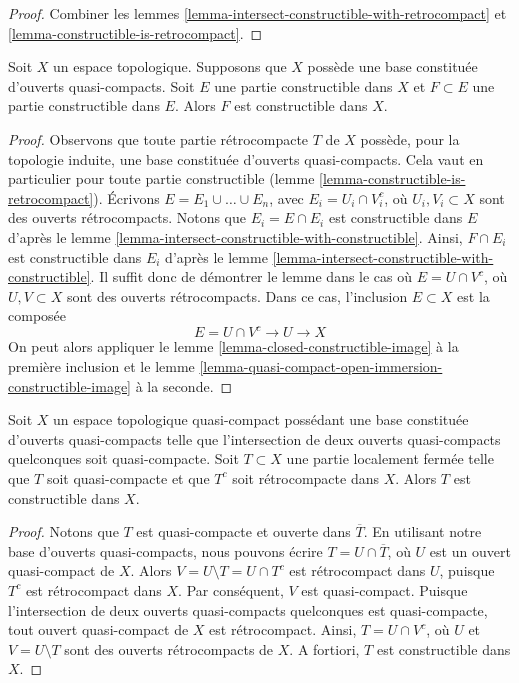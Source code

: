\begin{proof}
Combiner les lemmes \ref{lemma-intersect-constructible-with-retrocompact} et
\ref{lemma-constructible-is-retrocompact}.
\end{proof}

\begin{lemma}
\label{lemma-constructible-in-constructible}
Soit $X$ un espace topologique. Supposons que
$X$ possède une base constituée d'ouverts quasi-compacts.
Soit $E$ une partie constructible dans $X$ et $F \subset E$ une partie constructible dans $E$.
Alors $F$ est constructible dans $X$.
\end{lemma}

\begin{proof}
Observons que toute partie rétrocompacte $T$ de $X$ possède, pour la topologie
induite, une base constituée d'ouverts quasi-compacts. Cela vaut en particulier
pour toute partie constructible
(lemme \ref{lemma-constructible-is-retrocompact}).
Écrivons $E = E_1 \cup \ldots \cup E_n$, avec $E_i = U_i \cap V_i^c$,
où $U_i, V_i \subset X$ sont des ouverts rétrocompacts.
Notons que $E_i = E \cap E_i$ est constructible dans $E$ d'après le
lemme \ref{lemma-intersect-constructible-with-constructible}.
Ainsi, $F \cap E_i$ est constructible dans $E_i$ d'après le
lemme \ref{lemma-intersect-constructible-with-constructible}.
Il suffit donc de démontrer le lemme dans le cas où $E = U \cap V^c$,
où $U, V \subset X$ sont des ouverts rétrocompacts.
Dans ce cas, l'inclusion $E \subset X$ est la composée
$$
E = U \cap V^c \to U \to X
$$
On peut alors appliquer le lemme \ref{lemma-closed-constructible-image}
à la première inclusion et le
lemme \ref{lemma-quasi-compact-open-immersion-constructible-image}
à la seconde.
\end{proof}

\begin{lemma}
\label{lemma-locally-closed-constructible-image}
Soit $X$ un espace topologique quasi-compact possédant une base constituée
d'ouverts quasi-compacts telle que l'intersection de deux
ouverts quasi-compacts quelconques soit quasi-compacte.
Soit $T \subset X$ une partie localement fermée
telle que $T$ soit quasi-compacte et que $T^c$ soit rétrocompacte dans $X$.
Alors $T$ est constructible dans $X$.
\end{lemma}

\begin{proof}
Notons que $T$ est quasi-compacte et ouverte dans $\overline{T}$.
En utilisant notre base d'ouverts quasi-compacts, nous pouvons écrire
$T = U \cap \overline{T}$, où $U$ est un ouvert quasi-compact de $X$.
Alors $V = U \setminus T = U \cap T^c$ est rétrocompact dans $U$, puisque $T^c$
est rétrocompact dans $X$. Par conséquent, $V$ est quasi-compact. Puisque
l'intersection de deux ouverts quasi-compacts quelconques est quasi-compacte,
tout ouvert quasi-compact de $X$ est rétrocompact. Ainsi, $T = U \cap V^c$,
où $U$ et $V = U \setminus T$ sont des ouverts rétrocompacts de $X$.
A fortiori, $T$ est constructible dans $X$.
\end{proof}

